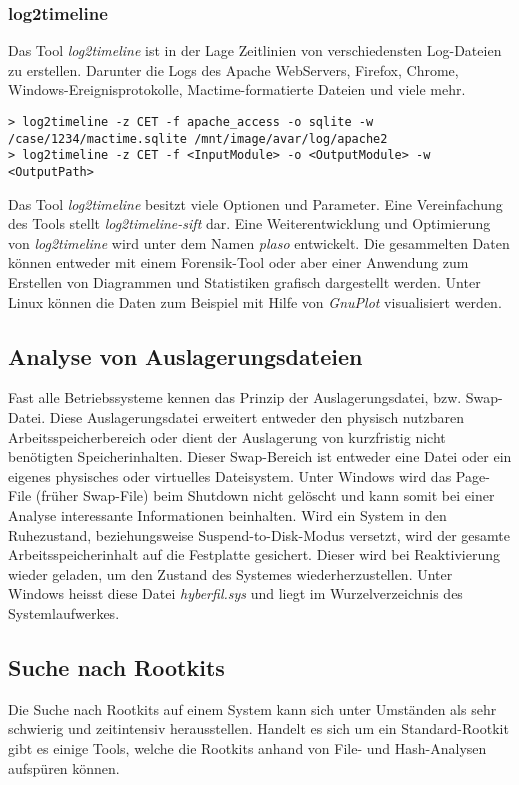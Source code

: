 \subsubsection{log2timeline}
Das Tool \textit{log2timeline} ist in der Lage Zeitlinien von verschiedensten Log-Dateien zu erstellen. Darunter die Logs des Apache WebServers, Firefox, Chrome, Windows-Ereignisprotokolle, Mactime-formatierte Dateien und viele mehr.

\begin{lstlisting}
> log2timeline -z CET -f apache_access -o sqlite -w /case/1234/mactime.sqlite /mnt/image/avar/log/apache2
> log2timeline -z CET -f <InputModule> -o <OutputModule> -w <OutputPath>
\end{lstlisting}

Das Tool \textit{log2timeline} besitzt viele Optionen und Parameter. Eine Vereinfachung des Tools stellt \textit{log2timeline-sift} dar. Eine Weiterentwicklung und Optimierung von \textit{log2timeline} wird unter dem Namen \textit{plaso} entwickelt. Die gesammelten Daten können entweder mit einem Forensik-Tool oder aber einer Anwendung zum Erstellen von Diagrammen und Statistiken grafisch dargestellt werden. Unter Linux können die Daten zum Beispiel mit Hilfe von \textit{GnuPlot} visualisiert werden.


\subsection{Analyse von Auslagerungsdateien}
Fast alle Betriebssysteme kennen das Prinzip der Auslagerungsdatei, bzw. Swap-Datei. Diese Auslagerungsdatei erweitert entweder den physisch nutzbaren Arbeitsspeicherbereich oder dient der Auslagerung von kurzfristig nicht benötigten Speicherinhalten. Dieser Swap-Bereich ist entweder eine Datei oder ein eigenes physisches oder virtuelles Dateisystem. Unter Windows wird das Page-File (früher Swap-File) beim Shutdown nicht gelöscht und kann somit bei einer Analyse interessante Informationen beinhalten. Wird ein System in den Ruhezustand, beziehungsweise Suspend-to-Disk-Modus versetzt, wird der gesamte Arbeitsspeicherinhalt auf die Festplatte gesichert. Dieser wird bei Reaktivierung wieder geladen, um den Zustand des Systemes wiederherzustellen. Unter Windows heisst diese Datei \textit{hyberfil.sys} und liegt im Wurzelverzeichnis des Systemlaufwerkes.



\subsection{Suche nach Rootkits}
Die Suche nach Rootkits auf einem System kann sich unter Umständen als sehr schwierig und zeitintensiv herausstellen. Handelt es sich um ein Standard-Rootkit gibt es einige Tools, welche die Rootkits anhand von File- und Hash-Analysen aufspüren können. 



